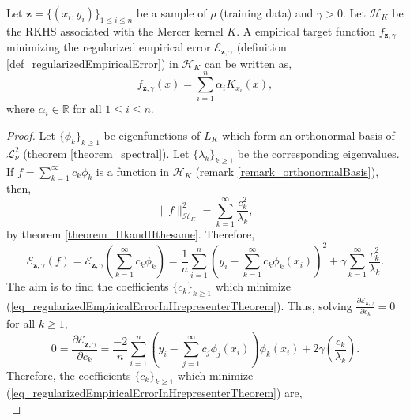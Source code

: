 \begin{theorem} \label{theorem_representer}
  Let $\pmb{z} = \{(x_i,y_i)\}_{1 \leq i \leq n}$ be a sample of $\rho$ (training data) and $\gamma > 0$. Let $\mathcal{H}_K$ be the RKHS associated with the Mercer kernel $K$. A empirical target function $f_{\pmb{z},\gamma}$ minimizing the regularized empirical error $\mathcal{E}_{\pmb{z},\gamma}$ (definition \ref{def_regularizedEmpiricalError}) in $\mathcal{H}_K$ can be written as,
  \begin{equation*}
    f_{\pmb{z},\gamma}(x) = \sum_{i=1}^n \alpha_i K_{x_i}(x), 
  \end{equation*}    
  where $\alpha_i \in \mathbb{R}$ for all $1 \leq i \leq n$.
  \begin{proof}
    Let $\{\phi_k\}_{k \geq 1}$ be eigenfunctions of $L_K$ which form an orthonormal basis of $\mathcal{L}_{\nu}^2$ (theorem \ref{theorem_spectral}). Let $\{\lambda_k\}_{k \geq 1}$ be the corresponding eigenvalues. If $f = \sum_{k=1}^{\infty} c_k \phi_k$ is a function in $\mathcal{H}_K$ (remark \ref{remark_orthonormalBasis}), then,
    \begin{equation*}
      \|f\|^2_{\mathcal{H}_K} = \sum_{k=1}^{\infty} \frac{c_k^2}{\lambda_k},
    \end{equation*}
    by theorem \ref{theorem_HkandHthesame}. Therefore,
    \begin{equation} \label{eq_regularizedEmpiricalErrorInHrepresenterTheorem}
      \mathcal{E}_{\pmb{z},\gamma}(f) 
          = \mathcal{E}_{\pmb{z},\gamma}(\sum_{k=1}^{\infty} c_k \phi_k) 
          = \frac{1}{n} \sum_{i=1}^n \left( y_i - \sum_{k=1}^{\infty} c_k \phi_k(x_i) \right)^2
            + \gamma  \sum_{k=1}^{\infty} \frac{c_k^2}{\lambda_k}.
    \end{equation}
    The aim is to find the coefficients $\{c_k\}_{k \geq 1}$ which minimize (\ref{eq_regularizedEmpiricalErrorInHrepresenterTheorem}). Thus, solving $\frac{\partial \mathcal{E}_{\pmb{z},\gamma}}{\partial c_k} = 0$ for all $k \geq 1$,
    \begin{equation*}
      0 = \frac{\partial \mathcal{E}_{\pmb{z},\gamma}}{\partial c_k} 
        = \frac{-2}{n} \sum_{i=1}^n 
            \left( y_i - \sum_{j=1}^{\infty} c_j \phi_j(x_i) \right)\phi_k(x_i)
          + 2\gamma \left( \frac{c_k}{\lambda_k} \right).
    \end{equation*}
    Therefore, the coefficients $\{c_k\}_{k \geq 1}$ which minimize (\ref{eq_regularizedEmpiricalErrorInHrepresenterTheorem}) are,
    \begin{equation} \label{eq_ckminimizing}

\end{equation}
\end{proof}
\end{theorem}
